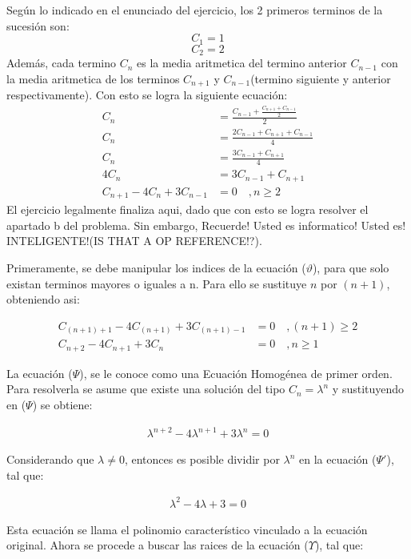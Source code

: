 Según lo indicado en el enunciado del ejercicio, los 2 primeros terminos de la sucesión son:
$$C_1=1$$
$$C_2=2$$
Además, cada termino $C_n$ es la media aritmetica del termino anterior $C_{n-1}$ con la media aritmetica de los terminos $C_{n+1}$ y $C_{n-1}$(termino siguiente y anterior respectivamente). Con esto se logra la siguiente ecuación:
\begin{align*}
    C_n &= \frac{C_{n-1} + \frac{C_{n+1}+C_{n-1}}{2}}{2} \\
    C_n &= \frac{2C_{n-1} + C_{n+1} + C_{n-1}}{4} \\
    C_n &= \frac{3C_{n-1} + C_{n+1}}{4} \\
    4C_n &= 3C_{n-1} + C_{n+1} \\
    C_{n+1} -4C_n + 3C_{n-1} &= 0 \quad ,n \ge 2  \tag{$\vartheta$}
\end{align*}
El ejercicio legalmente finaliza aqui, dado que con esto se logra resolver el apartado b del problema. Sin embargo, Recuerde! Usted es informatico! Usted es! INTELIGENTE!(IS THAT A OP REFERENCE!?).

Primeramente, se debe manipular los indices de la ecuación ($\vartheta$), para que solo existan terminos mayores o iguales a n. Para ello se sustituye $n$ por $(n+1)$, obteniendo asi:

\begin{align*}
    C_{(n+1)+1}-4C_{(n+1)}+3C_{(n+1)-1}&=0 \quad ,(n+1) \ge 2 \\
    C_{n+2}-4C_{n+1}+3C_{n}&=0 \quad ,n \ge 1 \tag{$\Psi$}
\end{align*}

La ecuación ({$\Psi$}), se le conoce como una Ecuación Homogénea de primer orden. Para resolverla se asume que existe una solución del tipo $C_n = \lambda^n$ y sustituyendo en ({$\Psi$}) se obtiene:

\begin{align*}
\lambda^{n+2} -4\lambda^{n+1} + 3\lambda^{n} = 0 
\end{align*}


Considerando que $\lambda\neq0$, entonces es posible dividir por $\lambda^n$ en la ecuación ($\Psi'$), tal que:

\begin{align*}
  \lambda^{2} -4\lambda + 3 = 0 \tag{$\Upsilon$}  
\end{align*}

Esta ecuación se llama el polinomio característico vinculado a la ecuación original. Ahora se procede a buscar las raices de la ecuación ($\Upsilon$), tal que:
 
